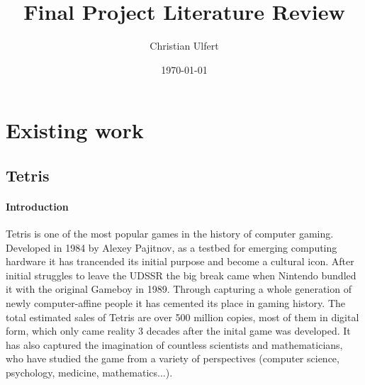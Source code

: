 \documentclass{article}
\title{Final Project Literature Review}
\author{Christian Ulfert}
\date{\today}
\begin{document}
\maketitle

\tableofcontents    

\section{Existing work}
\subsection{Tetris}
\paragraph{Introduction}
Tetris is one of the most popular games in the history of computer gaming. Developed in 1984 by Alexey Pajitnov, as a testbed for emerging computing hardware it has trancended its initial purpose and become a cultural icon. 
After initial struggles to leave the UDSSR the big break came when Nintendo bundled it with the original Gameboy in 1989. 
Through capturing a whole generation of newly computer-affine people it has cemented its place in gaming history. The total estimated sales of Tetris are over 500 million copies, most of them in digital form, which only came reality 3 decades after the inital game was developed.
It has also captured the imagination of countless scientists and mathematicians, who have studied the game from a variety of perspectives (computer science, psychology, medicine, mathematics...).
\end{document}
